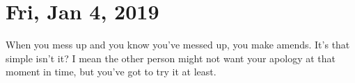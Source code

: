 \section{Fri, Jan 4, 2019}

When you mess up and you know you've messed up, you make amends. It's that simple
isn't it? I mean the other person might not want your apology at that moment in time,
but you've got to try it at least.
